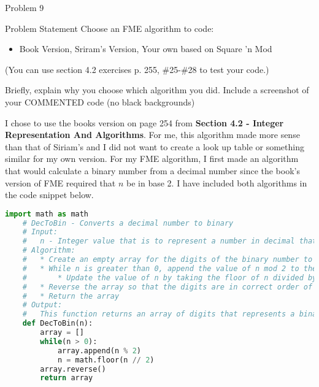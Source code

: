 \begin{problem}{Problem 9}
    \begin{statement}{Problem Statement}
        Choose an FME algorithm to code:
        
        \begin{itemize}
            \item Book Version, Sriram’s Version, Your own based on Square 'n Mod
        \end{itemize}
        (You can use section 4.2 exercises p. 255, \#25-\#28 to test your code.)

        Briefly, explain why you choose which algorithm you did. Include a screenshot of your COMMENTED code (no black backgrounds)
    \end{statement}

    \begin{highlight}[Solution]
        I chose to use the books version on page 254 from \textbf{Section 4.2 - Integer Representation And Algorithms}. For me, this algorithm made more sense than that of Siriam's and I did not want
        to create a look up table or something similar for my own version. For my FME algorithm, I first made an algorithm that would calculate a binary number from a decimal number since the book's
        version of FME required that $n$ be in base 2. I have included both algorithms in the code snippet below.

    \begin{lstlisting}[style=stackoverflow, language=python]
    import math as math
    # DecToBin - Converts a decimal number to binary
    # Input:
    #   n - Integer value that is to represent a number in decimal that is to be converted to binary
    # Algorithm:
    #   * Create an empty array for the digits of the binary number to be stored in
    #   * While n is greater than 0, append the value of n mod 2 to the array
    #       * Update the value of n by taking the floor of n divided by 2
    #   * Reverse the array so that the digits are in correct order of the binary number
    #   * Return the array
    # Output:
    #   This function returns an array of digits that represents a binary number
    def DecToBin(n):
        array = []
        while(n > 0):
            array.append(n % 2)
            n = math.floor(n // 2)
        array.reverse()
        return array
        

\end{lstlisting}
\end{highlight}
\end{problem}
